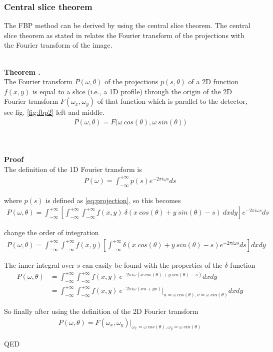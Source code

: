 \documentclass[report,12pt]{report}
\newcounter{theorem}
\newcounter{chpt}
\newcommand{\theorem}[2]
	{
		\hfill\\
		\textbf{Theorem \arabic{chpt}.\arabic{theorem}}\\
		#1
		\hfill\\
		\hfill\\
		\textbf{Proof}\\
		#2
		\begin{flushright}QED\end{flushright}
		\stepcounter{theorem}
}
\begin{document}
\subsubsection*{Central slice theorem}
The FBP method can be derived by using the central slice theorem. The central slice theorem as stated in \cite{leastsquare} relates the Fourier transform of the projections with the Fourier transform of the image.

\theorem{
The Fourier transform $P(\omega, \theta)$ of the projections $p(s, \theta)$ of a 2D function $f(x,y)$ is equal to a slice (i.e., a 1D profile) through the origin of the 2D Fourier transform $F(\omega_x, \omega_y)$ of that function which is parallel to the detector, see fig. \ref{fig:fbp2} left and middle.	
\begin{align}
	P(\omega,\theta) = F\big(\omega\ cos(\theta), \omega\ sin(\theta)\big)
\end{align}
}
{
The definition of the 1D Fourier transform is
\begin{align}
	P(\omega) = \int_{-\infty}^{+\infty} p(s) e^{-2\pi i \omega s}ds
\end{align}

where $p(s)$ is defined as \ref{eq:projection}, so this becomes
\begin{align}
	P(\omega, \theta) = \int_{-\infty}^{+\infty}
	\left[ \int_{-\infty}^{+\infty} \int_{-\infty}^{+\infty}
	f(x,y)\ \delta(x\ cos(\theta) + y\ sin(\theta) - s)\ dxdy \right] 
	e^{-2\pi i \omega s}ds
\end{align}

change the order of integration
\begin{align}
	P(\omega, \theta) = \int_{-\infty}^{+\infty}
	\int_{-\infty}^{+\infty} f(x,y)\left[
	\int_{-\infty}^{+\infty} 
	\delta(x\ cos(\theta) + y\ sin(\theta) - s)e^{-2\pi i \omega s}ds
	\right] dxdy
\end{align}

The inner integral over $s$ can easily be found with the properties of the $\delta$ function
\begin{align}
	P(\omega, \theta) &= \int_{-\infty}^{+\infty}
	\int_{-\infty}^{+\infty} f(x,y)\ e^{-2\pi i \omega (x\ cos(\theta) + y\ sin(\theta) - s)} dxdy
	\nonumber\\
	&= \int_{-\infty}^{+\infty} \int_{-\infty}^{+\infty} 
	f(x,y)\ e^{-2\pi i \omega (xu + y\nu)}\big\lvert_{u=\omega\ cos(\theta), \nu=\omega\ sin(\theta)} dxdy
\end{align}

So finally after using the definition of the 2D Fourier transform
\begin{align}
	P(\omega,\theta) = F(\omega_x, \omega_y)\big\lvert_{\omega_x =\omega\ cos(\theta), \omega_y=\omega\ sin(\theta)}
\end{align}
}
\end{document}
